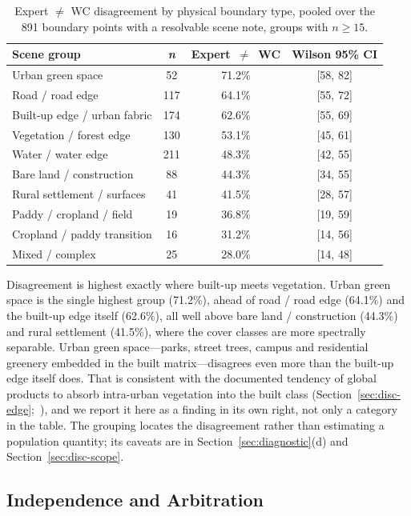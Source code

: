 \documentclass[remotesensing,article,submit,moreauthors]{Definitions/mdpi}
\begin{document}
\begin{table}[H]
\caption{Expert $\neq$ WC disagreement by physical boundary type, pooled over
the 891 boundary points with a resolvable scene note, groups with
$n \ge 15$.\label{tab:T4}}
\begin{tabularx}{\textwidth}{lCCC}
\toprule
\textbf{Scene group} & \textbf{\textit{n}} & \textbf{\mbox{Expert $\neq$ WC}}
& \textbf{Wilson 95\% CI}\\
\midrule
Urban green space              & 52  & 71.2\% & [58, 82]\\
Road / road edge               & 117 & 64.1\% & [55, 72]\\
Built-up edge / urban fabric   & 174 & 62.6\% & [55, 69]\\
Vegetation / forest edge       & 130 & 53.1\% & [45, 61]\\
Water / water edge             & 211 & 48.3\% & [42, 55]\\
Bare land / construction       & 88  & 44.3\% & [34, 55]\\
Rural settlement / surfaces    & 41  & 41.5\% & [28, 57]\\
Paddy / cropland / field       & 19  & 36.8\% & [19, 59]\\
Cropland / paddy transition    & 16  & 31.2\% & [14, 56]\\
Mixed / complex                & 25  & 28.0\% & [14, 48]\\
\bottomrule
\end{tabularx}
\end{table}

Disagreement is highest exactly where built-up meets vegetation. Urban green
space is the single highest group (71.2\%), ahead of road / road edge
(64.1\%) and the built-up edge itself (62.6\%), all well above bare land /
construction (44.3\%) and rural settlement (41.5\%),
where the cover classes are more spectrally separable. Urban green space---parks,
street trees, campus and residential greenery embedded in the built
matrix---disagrees even more than the built-up edge itself does. That is consistent with
the documented
tendency of global products to absorb intra-urban vegetation into the built
class (Section~\ref{sec:disc-edge};~\cite{yuan2026}), and we report it here
as a finding in its own right, not only a category in the table. The grouping
locates the disagreement rather than estimating a population quantity; its
caveats are in Section~\ref{sec:diagnostic}(d) and Section~\ref{sec:disc-scope}.

\subsection{Independence and Arbitration}\label{sec:results-independence}
\end{document}
